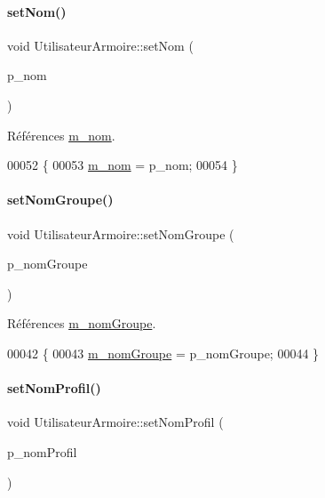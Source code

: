\paragraph{\texorpdfstring{set\+Nom()}{setNom()}}
{\footnotesize\ttfamily void Utilisateur\+Armoire\+::set\+Nom (\begin{DoxyParamCaption}\item[{Q\+String}]{p\+\_\+nom }\end{DoxyParamCaption})}



Références \hyperlink{class_utilisateur_armoire_a39e1227fe3c7d726b161acab6a5c3434}{m\+\_\+nom}.


\begin{DoxyCode}
00052 \{
00053     \hyperlink{class_utilisateur_armoire_a39e1227fe3c7d726b161acab6a5c3434}{m\_nom} = p\_nom;
00054 \}
\end{DoxyCode}
\mbox{\label{class_utilisateur_armoire_a4d2361e99dd2e84533ce8a2795607306}} 
\paragraph{\texorpdfstring{set\+Nom\+Groupe()}{setNomGroupe()}}
{\footnotesize\ttfamily void Utilisateur\+Armoire\+::set\+Nom\+Groupe (\begin{DoxyParamCaption}\item[{Q\+String}]{p\+\_\+nom\+Groupe }\end{DoxyParamCaption})}



Références \hyperlink{class_utilisateur_armoire_a6cf08d0dafdc9111d34f34a47c78b373}{m\+\_\+nom\+Groupe}.


\begin{DoxyCode}
00042 \{
00043     \hyperlink{class_utilisateur_armoire_a6cf08d0dafdc9111d34f34a47c78b373}{m\_nomGroupe} = p\_nomGroupe;
00044 \}
\end{DoxyCode}
\mbox{\label{class_utilisateur_armoire_ad71dd9b23c6bc145a64727642b1ac3f5}} 
\paragraph{\texorpdfstring{set\+Nom\+Profil()}{setNomProfil()}}
{\footnotesize\ttfamily void Utilisateur\+Armoire\+::set\+Nom\+Profil (\begin{DoxyParamCaption}\item[{Q\+String}]{p\+\_\+nom\+Profil }\end{DoxyParamCaption})}



